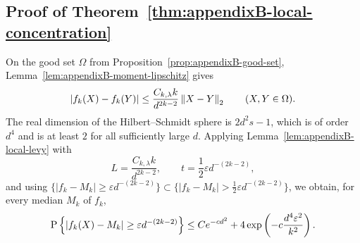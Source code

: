 \subsection{Proof of Theorem~\ref{thm:appendixB-local-concentration}}

On the good set \(\Omega\) from Proposition~\ref{prop:appendixB-good-set},
Lemma~\ref{lem:appendixB-moment-lipschitz} gives
\[
  |f_k(X)-f_k(Y)|
  \le
  \frac{C_{k,\lambda}k}{d^{2k-2}}\left\lVert X-Y\right\rVert_2
  \qquad (X,Y\in\Omega).
\]
The real dimension of the Hilbert--Schmidt sphere is \(2d^2s-1\), which is
of order \(d^4\) and is at least \(2\) for all sufficiently large \(d\).
Applying Lemma~\ref{lem:appendixB-local-levy} with
\[
  L=\frac{C_{k,\lambda}k}{d^{2k-2}},
  \qquad
  t=\frac12\varepsilon d^{-(2k-2)},
\]
and using
\(\{|f_k-M_k|\ge \varepsilon d^{-(2k-2)}\}
  \subset
  \{|f_k-M_k|>\frac12\varepsilon d^{-(2k-2)}\}\),
we obtain, for every median \(M_k\) of \(f_k\),
\[
  \operatorname{P}\left\{
    |f_k(X)-M_k|\ge \varepsilon d^{-(2k-2)}
  \right\}
  \le
  C e^{-c d^2}
  +
  4\exp\left(-c\frac{d^4\varepsilon^2}{k^2}\right).
\]

